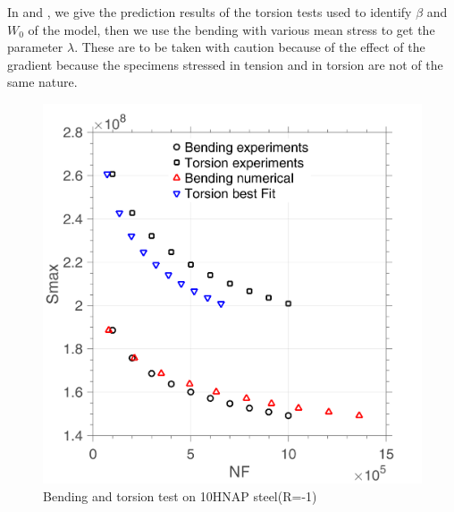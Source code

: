 In  and , we give the prediction results of the torsion tests used to identify $\beta$ and $W_0$ of the model, then we use the bending with various mean stress to get the parameter $\lambda$. These are to be taken with caution because of the effect of the gradient because the specimens stressed in tension and in torsion are not of the same nature.
\begin{figure}[!h]
	\centering
	\includegraphics[width=\textwidth]{figures//10HNAP_bt1D_sn.png} 
	\caption{Bending and torsion test on 10HNAP steel(R=-1)}
	\label{fig.bt1D10HNAPsn}
\end{figure}
